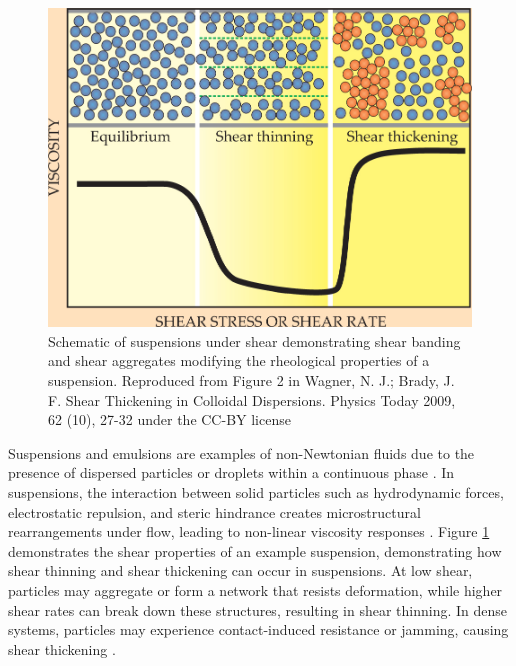 \begin{figure}
    \centering
    \includegraphics[scale = 0.3]{../figures/literature_review/shear_suspensions.jpeg}
    \caption{Schematic of suspensions under shear demonstrating shear banding and shear aggregates modifying the rheological properties of a suspension. 
             Reproduced from Figure 2 in Wagner, N. J.; Brady, J. F. Shear Thickening in Colloidal Dispersions. Physics Today 2009, 62 (10), 27-32 under the CC-BY license}
    \label{fig:suspension_shear}
\end{figure}

Suspensions and emulsions are examples of non-Newtonian fluids due to the presence of dispersed particles or droplets within a continuous phase
\cite{brader_nonlinear_2010, besseling_three-dimensional_2007, xu_relation_2013}.
In suspensions, the interaction  between solid particles such as hydrodynamic forces, electrostatic repulsion, and steric hindrance creates microstructural rearrangements under flow, leading to 
non-linear viscosity responses \cite{brader_nonlinear_2010, besseling_three-dimensional_2007}. Figure \ref{fig:suspension_shear} demonstrates the shear properties of an example suspension, 
demonstrating how shear thinning and shear thickening can occur in suspensions. At low shear, particles may aggregate or form a network that resists deformation, while higher shear rates can break 
down these structures, resulting in shear thinning. In dense systems, particles may experience contact-induced resistance or jamming, causing shear thickening \cite{brader_nonlinear_2010}. 

